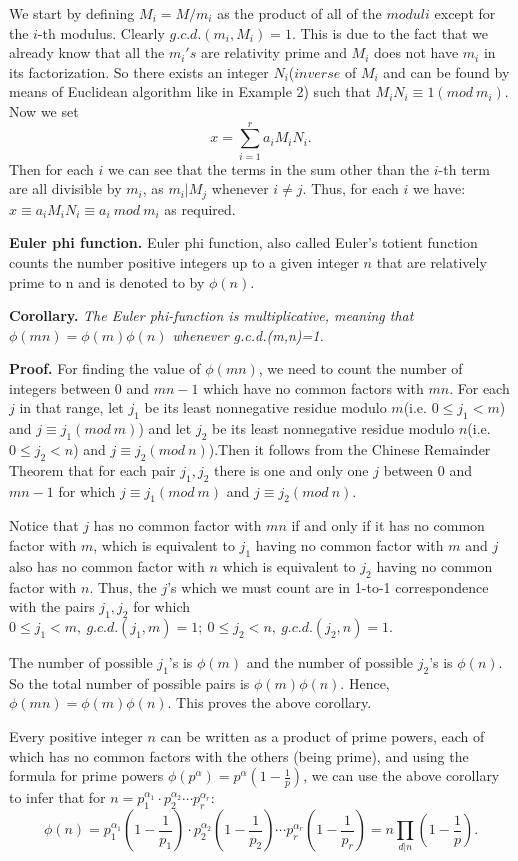 \documentclass[12pt]{article}
\begin{document}
We start by defining $M_i=M/m_i$ as the product of all of the $moduli$ except for the $i$-th modulus. Clearly $g.c.d.(m_i,M_i)=1$. This is due to the fact that we already know that all the $m_i's$ are relativity prime and $M_i$ does not have $m_i$ in its factorization. So there exists an integer $N_i$($inverse$ of $M_i$ and can be found by means of Euclidean algorithm like in Example 2) such that $M_iN_i \equiv 1 (mod \: m_i)$. Now we set
$$x=\sum_{i=1}^{r} a_i M_i N_i. $$
Then for each $i$ we can see that the terms in the sum other than the $i$-th term are all divisible by $m_i$, as $m_i | M_j$ whenever $i \neq j$. Thus, for each $i$ we have: $x \equiv a_i M_i N_i \equiv a_i \: mod \: m_i$ as required.

\textbf{Euler phi function.} Euler phi function, also called Euler's totient function counts the number positive integers up to a given integer $n$ that are relatively prime to n and is denoted to by $\phi(n)$.

\textbf{Corollary.}
\textit{The Euler phi-function is multiplicative, meaning that $\phi(mn)=\phi(m)\phi(n)$ whenever g.c.d.(m,n)=1.}

\textbf{Proof.} For finding the value  of $\phi(mn)$, we need to count the number of integers between 0 and $mn-1$ which have no common factors with $mn$. For each $j$ in that range, let $j_1$ be its least nonnegative residue modulo $m$(i.e. $0\leq j_1<m$) and $j \equiv j_1 (mod \: m)$) and let $j_2$ be its least nonnegative residue modulo $n$(i.e. $0\leq j_2<n$) and $j \equiv j_2 (mod \: n)$).Then it follows from the Chinese Remainder Theorem that for each pair $j_1,j_2$ there is one and only one $j$ between $0$ and $mn-1$  for which $j \equiv j_1 (mod \: m)$ and $j \equiv j_2 (mod \: n)$.

Notice that $j$ has no common factor with $mn$ if and only if it has no common factor with $m$, which is equivalent to $j_1$  having no common factor with $m$ and $j$ also has no common factor with $n$ which is equivalent to $j_2$ having no common factor with $n$. Thus, the $j$'s which we must count are in 1-to-1 correspondence with the pairs $j_1,j_2$ for which $0 \leq j_1 <m,\: g.c.d.(j_1,m)=1; \:0 \leq j_2 < n, \: g.c.d.(j_2,n)=1.$

The number of possible $j_1$'s is $\phi(m)$ and the number of possible $j_2$'s is $\phi(n)$. So the total number of possible pairs is $\phi(m) \phi(n)$. Hence, $\phi(mn)=\phi(m)\phi(n)$. This proves the above corollary.

Every positive integer $n$ can  be written as a product of prime powers, each of which has no common factors with the others (being prime), and using the formula for prime powers $\phi(p^\alpha) =p^\alpha (1- \frac{1}{p})$, we can use the above corollary to infer that for $n = p_1 ^{\alpha_1} \cdot p_2 ^{\alpha_2} \cdots p_r ^{\alpha_r}$:
$$\phi(n)=p_1 ^{\alpha_1}\left(1-\frac{1}{p_1}\right)\cdot p_2 ^{\alpha_2}\left(1-\frac{1}{p_2}\right)\cdots p_r ^{\alpha_r}\left(1-\frac{1}{p_r}\right)= n \prod_{d|n}\left(1-\frac{1}{p}\right).$$
\end{document}
